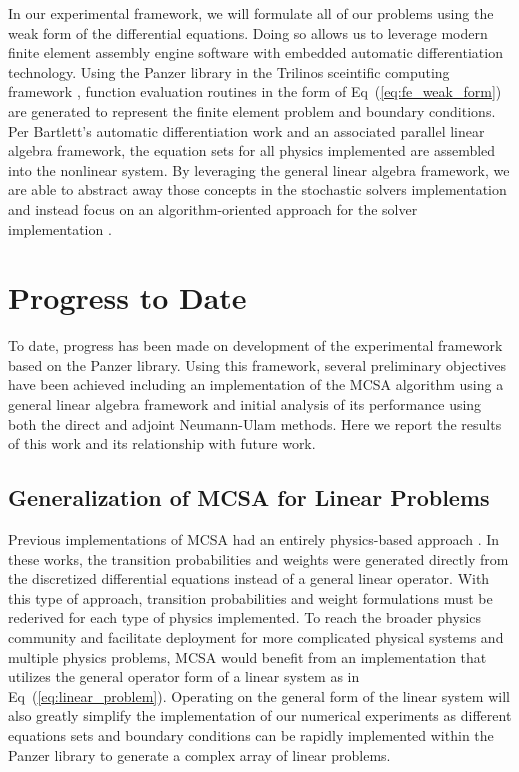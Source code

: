 In our experimental framework, we will formulate all of our problems
using the weak form of the differential equations. Doing so allows us
to leverage modern finite element assembly engine software with
embedded automatic differentiation technology. Using the Panzer
library in the Trilinos sceintific computing framework
\citep{heroux_overview_2005}, function evaluation routines in the form
of Eq~(\ref{eq:fe_weak_form}) are generated to represent the finite
element problem and boundary conditions. Per Bartlett's automatic
differentiation work and an associated parallel linear algebra
framework, the equation sets for all physics implemented are assembled
into the nonlinear system. By leveraging the general linear algebra
framework, we are able to abstract away those concepts in the
stochastic solvers implementation and instead focus on an
algorithm-oriented approach for the solver implementation
\citep{musser_algorithm-oriented_1994}.

\section{Progress to Date}
\label{sec:progress}
To date, progress has been made on development of the experimental
framework based on the Panzer library. Using this framework, several
preliminary objectives have been achieved including an implementation
of the MCSA algorithm using a general linear algebra framework and
initial analysis of its performance using both the direct and adjoint
Neumann-Ulam methods. Here we report the results of this work and its
relationship with future work.

\subsection{Generalization of MCSA for Linear Problems}
\label{subsec:mcsa_generalization}
Previous implementations of MCSA had an entirely physics-based
approach \citep{evans_monte_2009,evans_monte_2012}. In these works,
the transition probabilities and weights were generated directly from
the discretized differential equations instead of a general linear
operator. With this type of approach, transition probabilities and
weight formulations must be rederived for each type of physics
implemented. To reach the broader physics community and facilitate
deployment for more complicated physical systems and multiple physics
problems, MCSA would benefit from an implementation that utilizes the
general operator form of a linear system as in
Eq~(\ref{eq:linear_problem}). Operating on the general form of the
linear system will also greatly simplify the implementation of our
numerical experiments as different equations sets and boundary
conditions can be rapidly implemented within the Panzer library to
generate a complex array of linear problems.

